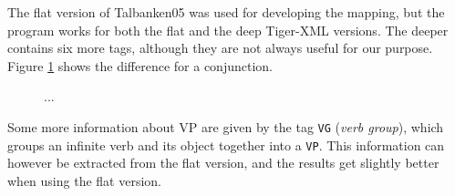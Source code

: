 \documentclass{report}
\begin{document}
The flat version of Talbanken05 was used for developing the mapping, but
the program works for both the flat and the deep Tiger-XML versions.
The deeper contains six more tags, although they are not always useful for our       
purpose. Figure \ref{fig:mappDeepFlat} shows the difference for a conjunction.
\begin{figure}[h]
\centering
{}
\caption{...}
\label{fig:mappDeepFlat}
\end{figure}

Some more information about VP are given by the tag \verb|VG| (\emph{verb group}),
which groups an infinite verb and its object together into a \verb|VP|.
This information can however be extracted from the flat version, and the results
get slightly better when using the flat version. \\
\end{document}
